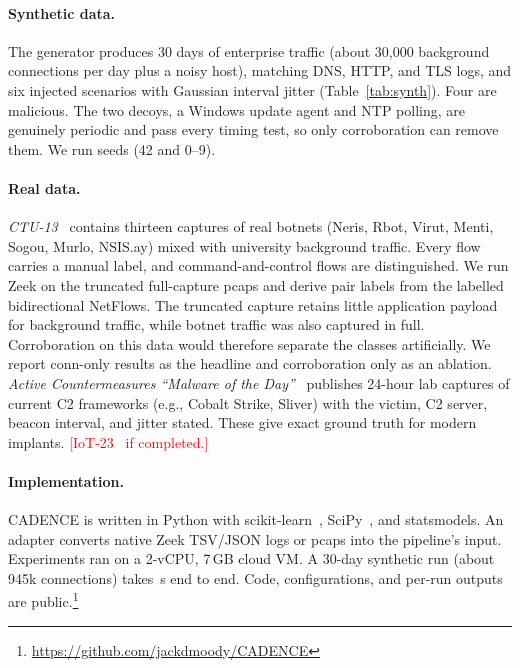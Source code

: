 \documentclass[runningheads]{llncs}
\newcommand{\pending}[1]{\textcolor{red}{[#1]}}
\begin{document}
\paragraph{Synthetic data.} The generator produces 30 days of enterprise traffic (about 30{,}000 background connections per day plus a noisy host), matching DNS, HTTP, and TLS logs, and six injected scenarios with Gaussian interval jitter (Table~\ref{tab:synth}). Four are malicious. The two decoys, a Windows update agent and NTP polling, are genuinely periodic and pass every timing test, so only corroboration can remove them. We run \SynSeeds{} seeds (42 and 0--9).

\paragraph{Real data.} \emph{CTU-13}~\cite{garcia2014ctu13} contains thirteen captures of real botnets (Neris, Rbot, Virut, Menti, Sogou, Murlo, NSIS.ay) mixed with university background traffic. Every flow carries a manual label, and command-and-control flows are distinguished. We run Zeek on the truncated full-capture pcaps and derive pair labels from the labelled bidirectional NetFlows. The truncated capture retains little application payload for background traffic, while botnet traffic was also captured in full. Corroboration on this data would therefore separate the classes artificially. We report conn-only results as the headline and corroboration only as an ablation. \emph{Active Countermeasures ``Malware of the Day''}~\cite{acm_motd} publishes 24-hour lab captures of current C2 frameworks (e.g., Cobalt Strike, Sliver) with the victim, C2 server, beacon interval, and jitter stated. These give exact ground truth for modern implants. \pending{IoT-23~\cite{parmisano2020iot23} if completed.}

\paragraph{Implementation.} CADENCE is written in Python with scikit-learn~\cite{pedregosa2011sklearn}, SciPy~\cite{virtanen2020scipy}, and statsmodels. An adapter converts native Zeek TSV/JSON logs or pcaps into the pipeline's input. Experiments ran on a 2-vCPU, 7\,GB cloud VM. A 30-day synthetic run (about 945k connections) takes \SynRuntime\,s end to end. Code, configurations, and per-run outputs are public.\footnote{\url{https://github.com/jackdmoody/CADENCE}}

\end{document}
